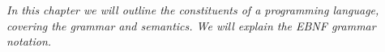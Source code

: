 \textit{In this chapter we will outline the constituents of a programming language, covering the grammar and semantics. We will explain the EBNF grammar notation.}